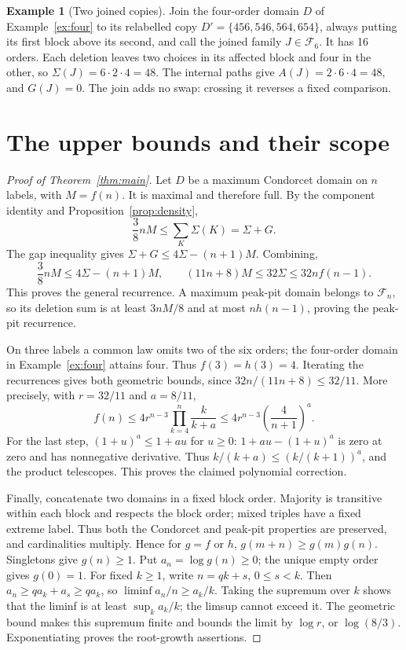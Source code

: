 \documentclass[11pt,letterpaper]{article}
\theoremstyle{definition}
\newtheorem{example}[theorem]{Example}
\newcommand{\F}{\mathcal F}
\newcommand{\Sig}{\Sigma}
\begin{document}
\begin{example}[Two joined copies]\label{ex:copies}
Join the four-order domain \(D\) of Example~\ref{ex:four} to its
relabelled copy \(D'=\{456,546,564,654\}\), always putting its first
block above its second, and call the joined family \(J\in\F_6\).
It has 16 orders. Each deletion leaves two choices in its affected
block and four in the other, so \(\Sig(J)=6\cdot2\cdot4=48\).
The internal paths give \(A(J)=2\cdot6\cdot4=48\), and \(G(J)=0\).
The join adds no swap: crossing it reverses a fixed comparison.
\end{example}

\clearpage
\section{The upper bounds and their scope}\label{sec:finish}
\begin{proof}[Proof of Theorem~\ref{thm:main}]
Let \(D\) be a maximum Condorcet domain on \(n\) labels, with
\(M=f(n)\). It is maximal and therefore full. By the component
identity and Proposition~\ref{prop:density},
\[
 \frac38 nM\leq\sum_K\Sig(K)=\Sig+G.
\]
The gap inequality gives \(\Sig+G\leq4\Sig-(n+1)M\). Combining,
\[
 \frac38nM\leq4\Sig-(n+1)M,
 \qquad (11n+8)M\leq32\Sig\leq32n f(n-1).
\]
This proves the general recurrence. A maximum peak-pit domain belongs
to \(\F_n\), so its deletion sum is at least \(3nM/8\) and at
most \(nh(n-1)\), proving the peak-pit recurrence.

On three labels a common law omits two of the six orders; the
four-order domain in Example~\ref{ex:four} attains four. Thus
\(f(3)=h(3)=4\). Iterating the recurrences gives both geometric
bounds, since \(32n/(11n+8)\leq32/11\).
More precisely, with \(r=32/11\) and \(a=8/11\),
\[
 f(n)\leq4r^{n-3}\prod_{k=4}^{n}\frac{k}{k+a}
 \leq4r^{n-3}\left(\frac4{n+1}\right)^a.
\]
For the last step, \((1+u)^a\leq1+au\) for \(u\geq0\):
\(1+au-(1+u)^a\) is zero at zero and has nonnegative derivative.
Thus \(k/(k+a)\leq(k/(k+1))^a\), and the product telescopes.
This proves the claimed polynomial correction.

Finally, concatenate two domains in a fixed block order. Majority is
transitive within each block and respects the block order; mixed
triples have a fixed extreme label. Thus both the Condorcet and
peak-pit properties are preserved, and cardinalities multiply.
Hence for \(g=f\) or \(h\),
\(g(m+n)\geq g(m)g(n)\). Singletons give \(g(n)\geq1\).
Put \(a_n=\log g(n)\geq0\); the unique empty order gives
\(g(0)=1\). For fixed \(k\geq1\), write \(n=qk+s\),
\(0\leq s<k\). Then \(a_n\geq q a_k+a_s\geq q a_k\), so
\(\liminf a_n/n\geq a_k/k\). Taking the supremum over \(k\)
shows that the liminf is at least \(\sup_k a_k/k\); the limsup
cannot exceed it. The geometric bound makes this supremum finite
and bounds the limit by \(\log r\), or \(\log(8/3)\).
Exponentiating proves the root-growth assertions.
\end{proof}
\end{document}
